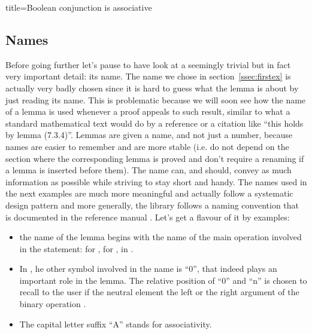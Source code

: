 \begin{coq}{title=Boolean conjunction is associative}
\subsection{Names}
Before going further let's pause to
have look at a seemingly trivial but in fact very important detail:
its name.  The name  we chose in
section~\ref{ssec:firstex} is actually very badly chosen since it is
hard to guess what the lemma is about by just reading its name.
This is problematic because we will soon see how the name of a lemma
is used whenever a proof appeals to such result,
similar to what a standard mathematical text would do by a reference or
a citation like ``this holds by lemma (7.3.4)''.  Lemmas are given a name,
and not just a number, because names are easier to remember and are more
stable (i.e. do not depend on the section where the corresponding lemma
is proved and don't require a renaming if a lemma is inserted before them).
The name can, and should, convey as much information as possible while
striving to stay short and handy. The
names used in the next examples are much more meaningful and actually
follow a systematic design pattern and more generally, the \mcbMC{}
library follows a naming convention that is documented in the
reference manual \cite{xxx}. Let's get a flavour of it by examples:

\begin{itemize}
\item the name of the lemma begins with the name of the main operation
  involved in the statement:  for ,  for
  ,  in .
\item In , he other symbol involved in the name is ``0'',
that indeed plays an important role in the lemma.  The relative position
of ``0'' and ``n'' is chosen to recall to the user if the neutral element
 the left or the right argument of the binary operation .
\item The capital letter suffix ``A'' stands for associativity.
\end{itemize}




\end{coq}
